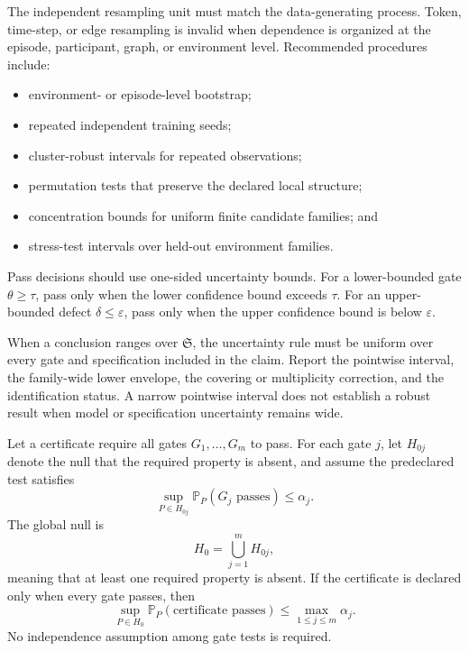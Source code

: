 The independent resampling unit must match the data-generating process. Token,
time-step, or edge resampling is invalid when dependence is organized at the
episode, participant, graph, or environment level. Recommended procedures
include:
\begin{itemize}
\item environment- or episode-level bootstrap;
\item repeated independent training seeds;
\item cluster-robust intervals for repeated observations;
\item permutation tests that preserve the declared local structure;
\item concentration bounds for uniform finite candidate families; and
\item stress-test intervals over held-out environment families.
\end{itemize}

Pass decisions should use one-sided uncertainty bounds. For a lower-bounded
gate \(\theta\geq\tau\), pass only when the lower confidence bound exceeds
\(\tau\). For an upper-bounded defect \(\delta\leq\varepsilon\), pass only when
the upper confidence bound is below \(\varepsilon\).

When a conclusion ranges over \(\mathfrak S\), the uncertainty rule must be
uniform over every gate and specification included in the claim. Report the
pointwise interval, the family-wide lower envelope, the covering or
multiplicity correction, and the identification status. A narrow pointwise
interval does not establish a robust result when model or specification
uncertainty remains wide.


\begin{SRWTtheorem}
\label{SRWT:thm:gatewise-validity}
Let a certificate require all gates \(G_1,\ldots,G_m\) to pass. For each gate
\(j\), let \(H_{0j}\) denote the null that the required property is absent, and
assume the predeclared test satisfies
\[
\sup_{P\in H_{0j}}
\mathbb P_P(G_j\text{ passes})
\leq
\alpha_j.
\]
The global null is
\[
H_0
=
\bigcup_{j=1}^m H_{0j},
\]
meaning that at least one required property is absent. If the certificate is
declared only when every gate passes, then
\[
\boxed{
\sup_{P\in H_0}
\mathbb P_P(\text{certificate passes})
\leq
\max_{1\leq j\leq m}\alpha_j.
}
\]
No independence assumption among gate tests is required.
\end{SRWTtheorem}

